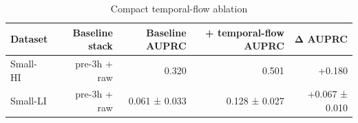 \begin{table}[t]
\centering
\caption{Compact temporal-flow ablation}
\begin{tabular}{lrrrr}
\toprule
Dataset & Baseline stack & Baseline AUPRC & + temporal-flow AUPRC & Δ AUPRC \\
\midrule
Small-HI & pre-3h + raw & 0.320 & 0.501 & +0.180 \\
Small-LI & pre-3h + raw & 0.061 ± 0.033 & 0.128 ± 0.027 & +0.067 ± 0.010 \\
\bottomrule
\end{tabular}
\end{table}
